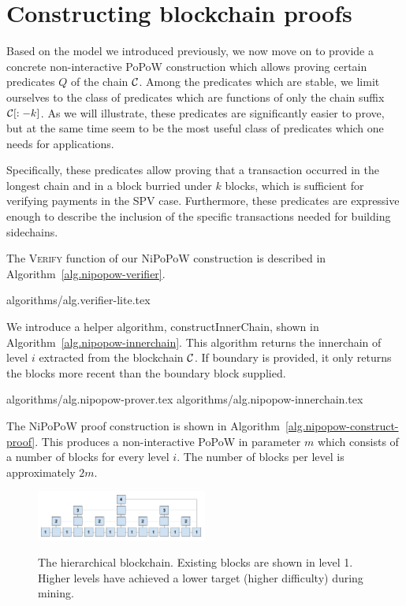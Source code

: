 \section{Constructing blockchain proofs}

Based on the model we introduced previously, we now move on to provide a
concrete non-interactive PoPoW construction which allows proving certain
predicates $Q$ of the chain $\mathcal{C}$. Among the predicates which are stable, we
limit ourselves to the class of predicates which are functions of only the
chain suffix $\mathcal{C}[:-k]$. As we will illustrate, these predicates are
significantly easier to prove, but at the same time seem to be the most useful
class of predicates which one needs for applications.

Specifically, these predicates allow proving that a transaction occurred in the
longest chain and in a block burried under $k$ blocks, which is sufficient for
verifying payments in the SPV case. Furthermore, these predicates are
expressive enough to describe the inclusion of the specific transactions needed
for building sidechains.

The \textsc{Verify} function of our NiPoPoW construction is described in
Algorithm~\ref{alg.nipopow-verifier}.

{algorithms/alg.verifier-lite.tex}

We introduce a helper algorithm, constructInnerChain, shown in
Algorithm~\ref{alg.nipopow-innerchain}. This algorithm returns the innerchain
of level $i$ extracted from the blockchain $\mathcal{C}$. If boundary is provided,
it only returns the blocks more recent than the boundary block supplied.

{algorithms/alg.nipopow-prover.tex}
{algorithms/alg.nipopow-innerchain.tex}

The NiPoPoW proof construction is shown in Algorithm~\ref{alg.nipopow-construct-proof}.
This produces a non-interactive PoPoW in parameter $m$ which consists of a
number of blocks for every level $i$. The number of blocks per level is
approximately $2m$.

\begin{figure}[h]
    \caption{The hierarchical blockchain. Existing blocks are shown in level 1.
    Higher levels have achieved a lower target (higher difficulty) during mining.}
    \centering
    \includegraphics[width=0.5\textwidth,keepaspectratio]{figures/hierarchical-ledger.png}
    \label{fig:hierarchy}
\end{figure}

